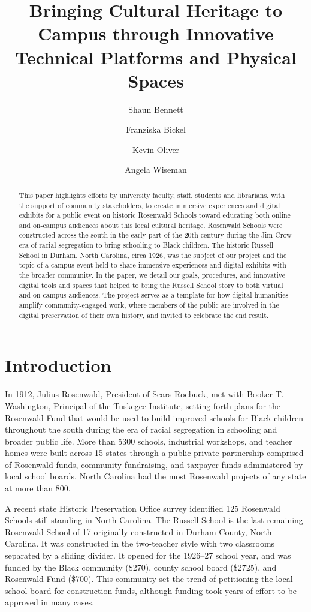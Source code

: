 \documentclass[final]{anthology-ch}  %
\title{Bringing Cultural Heritage to Campus through Innovative Technical Platforms and Physical Spaces}
\author[1]{Shaun Bennett}[
  orcid=0000-0002-5467-5068
]
\author[1]{Franziska Bickel}[
  orcid=0009-0007-0246-8212
]
\author[1]{Kevin Oliver}[
  orcid=0000-0001-8463-0621
]
\author[1]{Angela Wiseman}[
  orcid=0000-0001-6894-5498
]
\affiliation{1}{North Carolina State University, Raleigh, NC, USA}
\begin{document}
\maketitle

\begin{abstract}
This paper highlights efforts by university faculty, staff, students and librarians, with the support of community stakeholders, to create immersive experiences and digital exhibits for a public event on historic Rosenwald Schools toward educating both online and on-campus audiences about this local cultural heritage. Rosenwald Schools were constructed across the south in the early part of the 20th century during the Jim Crow era of racial segregation to bring schooling to Black children. The historic Russell School in Durham, North Carolina, circa 1926, was the subject of our project and the topic of a campus event held to share immersive experiences and digital exhibits with the broader community. In the paper, we detail our goals, procedures, and innovative digital tools and spaces that helped to bring the Russell School story to both virtual and on-campus audiences. The project serves as a template for how digital humanities amplify community-engaged work, where members of the public are involved in the digital preservation of their own history, and invited to celebrate the end result.
\end{abstract}

\section{Introduction}

In 1912, Julius Rosenwald, President of Sears Roebuck, met with Booker T. Washington, Principal of the Tuskegee Institute, setting forth plans for the Rosenwald Fund that would be used to build improved schools for Black children throughout the south during the era of racial segregation in schooling and broader public life. More than 5300 schools, industrial workshops, and teacher homes were built across 15 states through a public-private partnership comprised of Rosenwald funds, community fundraising, and taxpayer funds administered by local school boards. North Carolina had the most Rosenwald projects of any state at more than 800.

A recent state Historic Preservation Office survey identified 125 Rosenwald Schools still standing in North Carolina. The Russell School is the last remaining Rosenwald School of 17 originally constructed in Durham County, North Carolina. It was constructed in the two-teacher style with two classrooms separated by a sliding divider. It opened for the 1926--27 school year, and was funded by the Black community (\$270), county school board (\$2725), and Rosenwald Fund (\$700). This community set the trend of petitioning the local school board for construction funds, although funding took years of effort to be approved in many cases.
\end{document}
